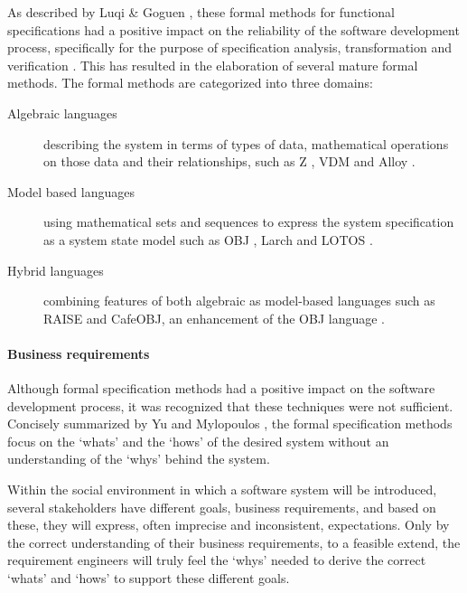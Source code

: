 As described by  Luqi \& Goguen , these formal methods for functional specifications had a positive impact on the reliability of the software development process, specifically for the purpose of specification analysis, transformation and verification .
This  has resulted  in the elaboration of several mature formal methods.
The formal methods are categorized into three domains:


\begin{description}
	\item[Algebraic languages] describing the system in terms of types of data, mathematical operations on those data and their relationships, such as Z , VDM  and Alloy .
	\item[Model based languages] using mathematical sets and sequences to express the system specification as a system state model such as OBJ , Larch  and LOTOS .
	\item[Hybrid languages] combining features of both algebraic as model-based languages such as RAISE  and CafeOBJ, an enhancement of the OBJ language .
\end{description}

\paragraph{Business requirements}
Although formal specification methods had a positive impact on the software development process, it was recognized that these techniques were not sufficient. Concisely summarized by Yu and Mylopoulos , the formal specification methods focus on the `whats' and the `hows' of the desired system without an understanding of the `whys' behind the system. 

Within the social environment in which a software system will be introduced, several stakeholders have different goals,  business requirements, and based on these, they will express, often imprecise and inconsistent, expectations. Only by the correct understanding of their business requirements, to a feasible extend, the requirement engineers will truly feel the `whys' needed to derive the correct `whats' and `hows' to support these different goals.

